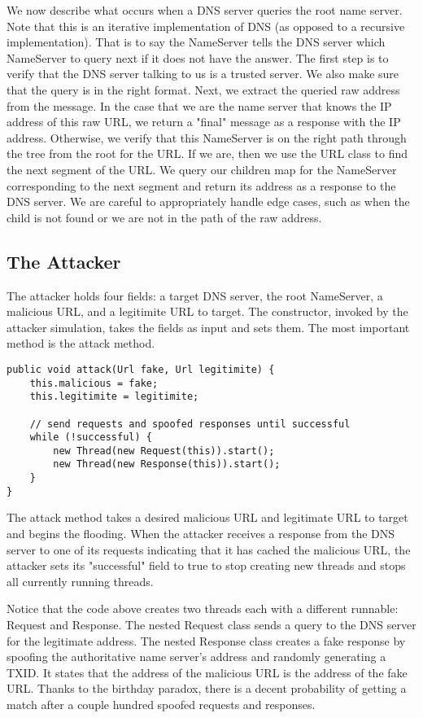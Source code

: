 \documentclass[a4paper, 12pt]{article} %
\begin{document}
We now describe what occurs when a DNS server queries the root name server. Note that this is an iterative implementation of DNS (as opposed to a recursive implementation). That is to say the NameServer tells the DNS server which NameServer to query next if it does not have the answer. The first step is to verify that the DNS server talking to us is a trusted server. We also make sure that the query is in the right format. Next, we extract the queried raw address from the message. In the case that we are the name server that knows the IP address of this raw URL, we return a "final" message as a response with the IP address. Otherwise, we verify that this NameServer is on the right path through the tree from the root for the URL. If we are, then we use the URL class to find the next segment of the URL. We query our children map for the NameServer corresponding to the next segment and return its address as a response to the DNS server. We are careful to appropriately handle edge cases, such as when the child is not found or we are not in the path of the raw address.

\subsection*{The Attacker}

The attacker holds four fields: a target DNS server, the root NameServer, a malicious URL, and a legitimite URL to target. The constructor, invoked by the attacker simulation, takes the fields as input and sets them. The most important method is the attack method.

\begin{lstlisting}
public void attack(Url fake, Url legitimite) {
    this.malicious = fake;
    this.legitimite = legitimite;
    
    // send requests and spoofed responses until successful
    while (!successful) {
        new Thread(new Request(this)).start();
        new Thread(new Response(this)).start();
    }
}
\end{lstlisting}

The attack method takes a desired malicious URL and legitimate URL to target and begins the flooding. When the attacker receives a response from the DNS server to one of its requests indicating that it has cached the malicious URL, the attacker sets its "successful" field to true to stop creating new threads and stops all currently running threads.

Notice that the code above creates two threads each with a different runnable: Request and Response. The nested Request class sends a query to the DNS server for the legitimate address. The nested Response class creates a fake response by spoofing the authoritative name server's address and randomly generating a TXID. It states that the address of the malicious URL is the address of the fake URL. Thanks to the birthday paradox, there is a decent probability of getting a match after a couple hundred spoofed requests and responses.
\end{document}
